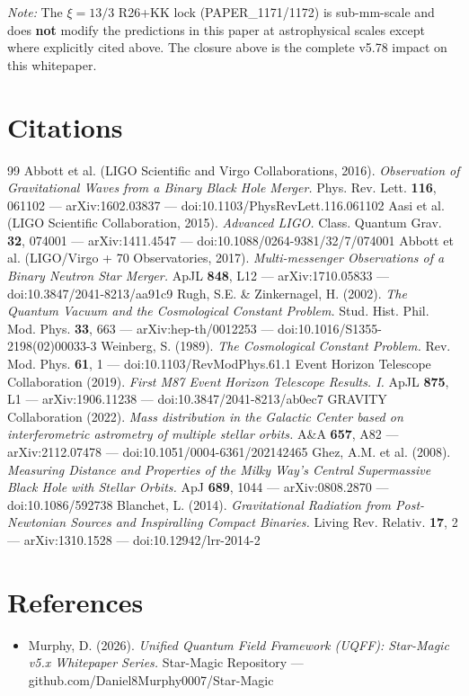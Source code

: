 \documentclass[12pt,a4paper]{article}
\begin{document}
\emph{Note:} The $\xi = 13/3$ R26+KK lock (PAPER\_1171/1172) is sub-mm-scale and does \textbf{not} modify the predictions in this paper at astrophysical scales except where explicitly cited above. The closure above is the complete v5.78 impact on this whitepaper.


\section*{Citations}
\begin{thebibliography}{99}
 Abbott et al. (LIGO Scientific and Virgo Collaborations, 2016). \emph{Observation of Gravitational Waves from a Binary Black Hole Merger.} Phys. Rev. Lett. \textbf{116}, 061102 --- arXiv:1602.03837 --- doi:10.1103/PhysRevLett.116.061102
 Aasi et al. (LIGO Scientific Collaboration, 2015). \emph{Advanced LIGO.} Class. Quantum Grav. \textbf{32}, 074001 --- arXiv:1411.4547 --- doi:10.1088/0264-9381/32/7/074001
 Abbott et al. (LIGO/Virgo + 70 Observatories, 2017). \emph{Multi-messenger Observations of a Binary Neutron Star Merger.} ApJL \textbf{848}, L12 --- arXiv:1710.05833 --- doi:10.3847/2041-8213/aa91c9
 Rugh, S.E. \& Zinkernagel, H. (2002). \emph{The Quantum Vacuum and the Cosmological Constant Problem.} Stud. Hist. Phil. Mod. Phys. \textbf{33}, 663 --- arXiv:hep-th/0012253 --- doi:10.1016/S1355-2198(02)00033-3
 Weinberg, S. (1989). \emph{The Cosmological Constant Problem.} Rev. Mod. Phys. \textbf{61}, 1 --- doi:10.1103/RevModPhys.61.1
 Event Horizon Telescope Collaboration (2019). \emph{First M87 Event Horizon Telescope Results. I.} ApJL \textbf{875}, L1 --- arXiv:1906.11238 --- doi:10.3847/2041-8213/ab0ec7
 GRAVITY Collaboration (2022). \emph{Mass distribution in the Galactic Center based on interferometric astrometry of multiple stellar orbits.} A\&A \textbf{657}, A82 --- arXiv:2112.07478 --- doi:10.1051/0004-6361/202142465
 Ghez, A.M. et al. (2008). \emph{Measuring Distance and Properties of the Milky Way's Central Supermassive Black Hole with Stellar Orbits.} ApJ \textbf{689}, 1044 --- arXiv:0808.2870 --- doi:10.1086/592738
 Blanchet, L. (2014). \emph{Gravitational Radiation from Post-Newtonian Sources and Inspiralling Compact Binaries.} Living Rev. Relativ. \textbf{17}, 2 --- arXiv:1310.1528 --- doi:10.12942/lrr-2014-2
\end{thebibliography}

\section*{References}
\begin{itemize}
  \item[2.] Murphy, D. (2026). \emph{Unified Quantum Field Framework (UQFF): Star-Magic v5.x Whitepaper Series.} Star-Magic Repository --- github.com/Daniel8Murphy0007/Star-Magic
\end{itemize}

\end{document}
